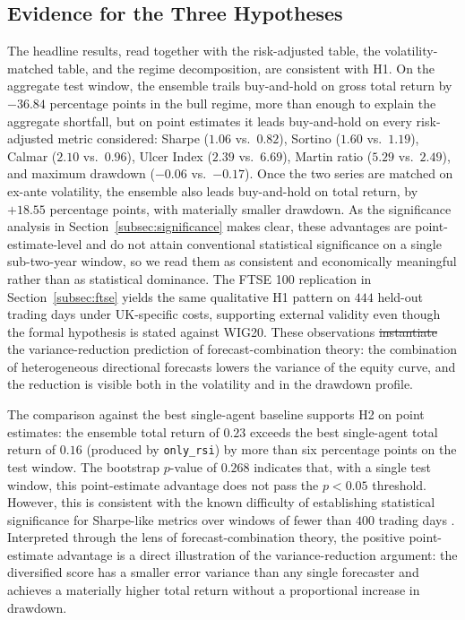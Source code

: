 \documentclass{ieeeaccess}
\newcommand{\TRtest}{\ensuremath{0.23}}
\newcommand{\Shtest}{\ensuremath{1.06}}
\newcommand{\MDDtest}{\ensuremath{-0.06}}
\newcommand{\Calmtest}{\ensuremath{2.10}}
\newcommand{\BHsharpe}{\ensuremath{0.82}}
\newcommand{\MDDbh}{\ensuremath{-0.17}}
\newcommand{\Calmbh}{\ensuremath{0.96}}
\newcommand{\BestSingleName}{\texttt{only\_rsi}}
\newcommand{\BestSingleTR}{\ensuremath{0.16}}
\newcommand{\PvsBestSingle}{\ensuremath{0.268}}
\newcommand{\EnsSortino}{\ensuremath{1.60}}
\newcommand{\BHSortino}{\ensuremath{1.19}}
\newcommand{\EnsUlcer}{\ensuremath{2.39}}
\newcommand{\BHUlcer}{\ensuremath{6.69}}
\newcommand{\EnsMartin}{\ensuremath{5.29}}
\newcommand{\BHMartin}{\ensuremath{2.49}}
\newcommand{\VolScaledExcessPP}{\ensuremath{+18.55}}
\newcommand{\BullShortfallPP}{\ensuremath{-36.84}}
\newcommand{\FtseOOSDays}{\ensuremath{444}}
\providecommand{\DIFaddtex}[1]{{\protect\color{blue}\uwave{#1}}} %
\providecommand{\DIFdeltex}[1]{{\protect\color{red}\sout{#1}}}                      %
\providecommand{\DIFaddbegin}{} %
\providecommand{\DIFaddend}{} %
\providecommand{\DIFdelbegin}{} %
\providecommand{\DIFdelend}{} %
\providecommand{\DIFadd}[1]{\texorpdfstring{\DIFaddtex{#1}}{#1}} %
\providecommand{\DIFdel}[1]{\texorpdfstring{\DIFdeltex{#1}}{}} %
\newcommand{\DIFscaledelfig}{0.5}
\newlength{\DIFdelgraphicswidth} %
\newlength{\DIFdelgraphicsheight} %
\newcommand{\DIFaddincludegraphics}[2][]{{\color{blue}\fbox{\DIFOincludegraphics[#1]{#2}}}} %
\newcommand{\DIFdelincludegraphics}[2][]{%
\sbox{\DIFdelgraphicsbox}{\DIFOincludegraphics[#1]{#2}}%
\settoboxwidth{\DIFdelgraphicswidth}{\DIFdelgraphicsbox} %
\settoboxtotalheight{\DIFdelgraphicsheight}{\DIFdelgraphicsbox} %
\scalebox{\DIFscaledelfig}{%
\parbox[b]{\DIFdelgraphicswidth}{\usebox{\DIFdelgraphicsbox}\\[-\baselineskip] \rule{\DIFdelgraphicswidth}{0em}}\llap{\resizebox{\DIFdelgraphicswidth}{\DIFdelgraphicsheight}{%
\setlength{\unitlength}{\DIFdelgraphicswidth}%
\begin{picture}(1,1)%
\thicklines\linethickness{2pt} %
{\color[rgb]{1,0,0}\put(0,0){\framebox(1,1){}}}%
{\color[rgb]{1,0,0}\put(0,0){\line( 1,1){1}}}%
{\color[rgb]{1,0,0}\put(0,1){\line(1,-1){1}}}%
\end{picture}%
}\hspace*{3pt}}} %
} %
\DeclareRobustCommand{\DIFaddbegin}{\DIFOaddbegin \let\includegraphics\DIFaddincludegraphics} %
\DeclareRobustCommand{\DIFaddend}{\DIFOaddend \let\includegraphics\DIFOincludegraphics} %
\DeclareRobustCommand{\DIFdelbegin}{\DIFOdelbegin \let\includegraphics\DIFdelincludegraphics} %
\DeclareRobustCommand{\DIFdelend}{\DIFOaddend \let\includegraphics\DIFOincludegraphics} %
\begin{document}
\DIFaddend \subsection{Evidence for the Three Hypotheses}

The headline results, read together with the risk-adjusted table, the volatility-matched table, and the regime decomposition, are consistent with H1. On the aggregate test window, the ensemble trails buy-and-hold on gross total return by $\BullShortfallPP{}$ percentage points in the bull regime, more than enough to explain the aggregate shortfall, but on point estimates it leads buy-and-hold on every risk-adjusted metric considered: Sharpe ($\Shtest{}$ vs.\ $\BHsharpe{}$), Sortino ($\EnsSortino{}$ vs.\ $\BHSortino{}$), Calmar ($\Calmtest{}$ vs.\ $\Calmbh{}$), Ulcer Index ($\EnsUlcer{}$ vs.\ $\BHUlcer{}$), Martin ratio ($\EnsMartin{}$ vs.\ $\BHMartin{}$), and maximum drawdown ($\MDDtest{}$ vs.\ $\MDDbh{}$). Once the two series are matched on ex-ante volatility, the ensemble also leads buy-and-hold on total return, by $\VolScaledExcessPP{}$ percentage points, with materially smaller drawdown. As the significance analysis in Section~\ref{subsec:significance} makes clear, these advantages are point-estimate-level and do not attain conventional statistical significance on a single sub-two-year window, so we read them as consistent and economically meaningful rather than as statistical dominance. The FTSE 100 replication in Section~\ref{subsec:ftse} yields the same qualitative H1 pattern on \FtseOOSDays{} held-out trading days under UK-specific costs, supporting external validity even though the formal hypothesis is stated against WIG20. These observations \DIFdelbegin \DIFdel{instantiate }\DIFdelend \DIFaddbegin \DIFadd{are consistent with }\DIFaddend the variance-reduction prediction of forecast-combination theory: the combination of heterogeneous directional forecasts lowers the variance of the equity curve, and the reduction is visible both in the volatility and in the drawdown profile.

The comparison against the best single-agent baseline supports H2 on point estimates: the ensemble total return of $\TRtest$ exceeds the best single-agent total return of $\BestSingleTR$ (produced by \BestSingleName{}) by more than six percentage points on the test window. The bootstrap $p$-value of $\PvsBestSingle$ indicates that, with a single test window, this point-estimate advantage does not pass the $p < 0.05$ threshold. However, this is consistent with the known difficulty of establishing statistical significance for Sharpe-like metrics over windows of fewer than $400$ trading days \cite{bailey2014}. Interpreted through the lens of forecast-combination theory, the positive point-estimate advantage is a direct illustration of the variance-reduction argument: the diversified score has a smaller error variance than any single forecaster and achieves a materially higher total return without a proportional increase in drawdown.
\end{document}
